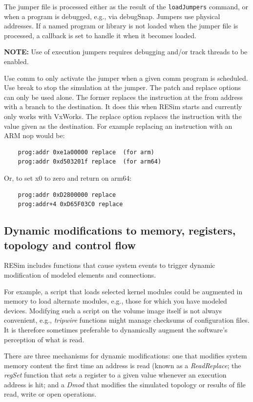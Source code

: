 \documentclass[titlepage]{article}
\begin{document}
The jumper file is processed either as the result of the {\tt loadJumpers} command, or when a program
is debugged, e.g., via debugSnap.  Jumpers use physical addresses.  If a named program or library is not loaded 
when the jumper file is processed, a callback is set to handle it when it becomes loaded.  

\textbf{NOTE:} Use of execution jumpers requires debugging and/or track threads to be enabled.

Use comm to only activate the jumper when a given comm program is scheduled.  Use break to stop the
simulation at the jumper.  The patch and replace options can only be used alone.  The former
replaces the instruction at the from address with a branch to the destination.  It does this when
RESim starts and currently only works with VxWorks.  The replace option replaces the instruction
with the value given as the destination.  For example replacing an instruction with an ARM nop would be:
   
\begin{verbatim}
    prog:addr 0xe1a00000 replace  (for arm)
    prog:addr 0xd503201f replace  (for arm64)
\end{verbatim}
\noindent Or, to set x0 to zero and return on arm64:
\begin{verbatim}
    prog:addr 0xD2800000 replace  
    prog:addr+4 0xD65F03C0 replace  
\end{verbatim}

\subsection{Dynamic modifications to memory, registers, topology and control flow}
\label{dmod}
RESim includes functions that cause system events to trigger dynamic modification of modeled elements and connections.

For example, a script that loads selected kernel modules could be augmented in memory to
load alternate modules, e.g., those for which you have modeled devices.  Modifying such a script on the volume
image itself is not always convenient, e.g., \textit{tripwire} functions might manage checksums of
configuration files.  It is therefore sometimes preferable to dynamically augment the software's perception of what is read.

There are three mechanisms for dynamic modifications: one that modifies system memory content the first time an address is
read (known as a \textit{ReadReplace}; the \textit{regSet} function that sets a register to a given value whenever an execution 
address is hit; and a \textit{Dmod} that modifies the simulated topology or results of file read, write or open operations.
\end{document}
